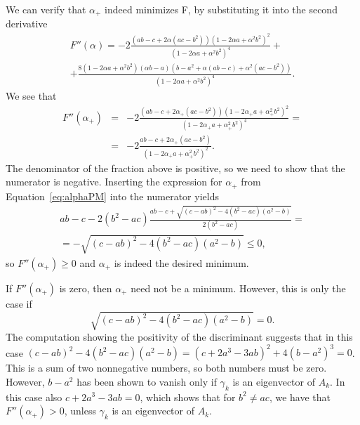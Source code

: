 \documentclass[11pt, onecolumn, journal,compsoc]{IEEEtran}
\theoremstyle{plain}
\theoremstyle{remark}
\begin{document}
We can verify that $\alpha_+$ indeed minimizes F, by substituting it into the second derivative
{\begin{align*}F''(\alpha) = -2\tfrac{(ab-c + 2\alpha(ac-b^2))(1-2\alpha a +\alpha^2 b^2)^2}{(1-2\alpha a+\alpha^2 b^2)^4}+\\
	+\tfrac{8(1-2\alpha a + \alpha^2 b^2)(\alpha b - a)(b-a^2+\alpha(ab-c)+\alpha^2(ac-b^2))}{(1-2\alpha a+\alpha^2 b^2)^4}.
	\end{align*}}
We see that
{\begin{align*}
	F''(\alpha_+) &=& -2\tfrac{(ab-c + 2\alpha_+(ac-b^2))(1-2\alpha_+ a +\alpha_+^2 b^2)^2}{(1-2\alpha_+ a+\alpha_+^2 b^2)^4} =\\ &=& -2\tfrac{ab-c + 2\alpha_+(ac-b^2)}{(1-2\alpha_+ a+\alpha_+^2 b^2)^2}.
	\end{align*}}
The denominator of the fraction above is positive, so we need to show that the numerator is negative. Inserting the expression for $\alpha_+$ from Equation~\eqref{eq:alphaPM} into the numerator yields
\begin{align*}
ab-c - 2(b^2-ac)\tfrac{ab-c+\sqrt{(c-ab)^2 - 4(b^2-ac)(a^2-b)}}{2(b^2-ac)}=\\= -\sqrt{(c-ab)^2 - 4(b^2-ac)(a^2-b)}\leq0,
\end{align*}
so $F''(\alpha_+)\geq0$ and $\alpha_+$ is indeed the desired minimum. 

If $F''(\alpha_+)$ is zero, then $\alpha_+$ need not be a minimum. However, this is only the case if \[\sqrt{(c-ab)^2 - 4(b^2-ac)(a^2-b)} = 0.\] The computation showing the positivity of the discriminant suggests that in this case $(c-ab)^2 - 4(b^2-ac)(a^2-b) =  (c+2a^3-3ab)^2 + 4(b -a^2)^3 = 0$. This is a sum of two nonnegative numbers, so both numbers must be zero. However, $b-a^2$ has been shown to vanish only if $\gamma_k$ is an eigenvector of $A_k$. In this case also $c+2a^3 - 3ab = 0$, which shows that for $b^2\neq ac$, we have that $F''(\alpha_+)>0$, unless $\gamma_k$ is an eigenvector of $A_k$.
\end{document}
